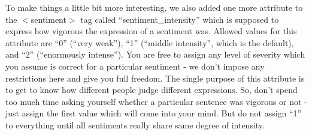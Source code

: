 \documentclass[11pt,a4paper]{article}
\begin{document}
To make things a little bit more interesting, we also added one more
attribute to the $<$sentiment$>$ tag called ``sentiment\_intensity''
which is supposed to express how vigorous the expression of a
sentiment was. Allowed values for this attribute are ``0'' (``very
weak''), ``1'' (``middle intensity'', which is the default), and ``2''
(``enormously intense''). You are free to assign any level of severity
which you assume is correct for a particular sentiment - we don't
impose any restrictions here and give you full freedom. The single
purpose of this attribute is to get to know how different people judge
different expressions. So, don't spend too much time asking yourself
whether a particular sentence was vigorous or not - just assign the
first value which will come into your mind. But do not assign ``1'' to
everything until all sentiments really share same degree of intensity.
\end{document}
